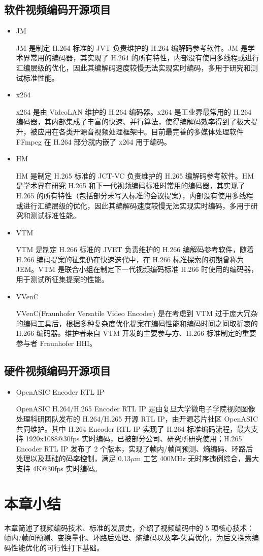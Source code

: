 \subsection{软件视频编码开源项目}
\begin{itemize}
    \item JM

          JM 是制定 H.264 标准的 JVT 负责维护的 H.264 编解码参考软件。JM 是学术界常用的编码器，其实现了 H.264 的所有特性，内部没有使用多线程或进行汇编层级的优化，因此其编解码速度较慢无法实现实时编码，多用于研究和测试标准性能。

    \item x264

          x264 是由 VideoLAN 维护的 H.264 编码器。x264 是工业界最常用的 H.264 编码器，其内部集成了丰富的快速、并行算法，使得编解码效率得到了极大提升，被应用在各类开源音视频处理框架中。目前最完善的多媒体处理软件 FFmpeg 在 H.264 部分就内嵌了 x264 用于编码。

    \item HM

          HM 是制定 H.265 标准的 JCT-VC 负责维护的 H.265 编解码参考软件。HM 是学术界在研究 H.265 和下一代视频编码标准时常用的编码器，其实现了 H.265 的所有特性（包括部分未写入标准的会议提案），内部没有使用多线程或进行汇编层级的优化，因此其编解码速度较慢无法实现实时编码，多用于研究和测试标准性能。

    \item VTM

          VTM 是制定 H.266 标准的 JVET 负责维护的 H.266 编解码参考软件，随着 H.266 编码提案的征集仍在快速迭代中，在 H.266 标准探索的初期曾称为 JEM。VTM 是联合小组在制定下一代视频编码标准 H.266 时使用的编码器，用于测试所征集提案的性能。

    \item VVenC

          VVenC(Fraunhofer Versatile Video Encoder) 是在考虑到 VTM 过于庞大冗杂的编码工具后，根据多种复杂度优化提案在编码性能和编码时间之间取折衷的 H.266 编码器。维护者来自 VTM 开发的主要参与方、H.266 标准制定的重要参与者 Fraunhofer HHI。
\end{itemize}

\subsection{硬件视频编码开源项目}
\begin{itemize}
    \item OpenASIC Encoder RTL IP

          OpenASIC H.264/H.265 Encoder RTL IP 是由复旦大学微电子学院视频图像处理科研团队发布的 H.264/H.265 开源 RTL IP，由开源芯片社区 OpenASIC 共同维护。其中 H.264 Encoder RTL IP 实现了 H.264 标准编码流程，最大支持 1920x1088@30fps 实时编码，已被部分公司、研究所研究使用；H.265 Encoder RTL IP 发布了 2 个版本，实现了帧内/帧间预测、熵编码、环路后处理以及基础的码率控制，满足 0.13$\mu$m 工艺 400MHz 无时序违例综合，最大支持 4K@30fps 实时编码。
\end{itemize}

\section{本章小结}
本章简述了视频编码技术、标准的发展史，介绍了视频编码中的 5 项核心技术：帧内/帧间预测、变换量化、环路后处理、熵编码以及率-失真优化，为后文探索编码性能优化的可行性打下基础。